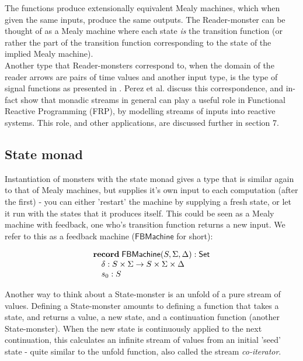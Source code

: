 \documentclass{article}
\begin{document}
The functions produce extensionally equivalent Mealy machines, which when given the same inputs, produce the same outputs. The Reader-monster can be thought of as a Mealy machine where each state \emph{is} the transition function (or rather the part of the transition function corresponding to the state of the implied Mealy machine). \\

Another type that Reader-monsters correspond to, when the domain of the reader arrows are pairs of time values and another input type, is the type of signal functions as presented in \cite{frp_refactored}. Perez et al. discuss this correspondence, and in-fact show that monadic streams in general can play a useful role in Functional Reactive Programming (FRP), by modelling streams of inputs into reactive systems. This role, and other applications, are discussed further in section 7.
                             
\subsection{State monad}

Instantiation of monsters with the state monad gives a type that is similar again to that of Mealy machines, but supplies it's own input to each computation (after the first) - you can either 'restart' the machine by supplying a fresh state, or let it run with the states that it produces itself. This could be seen as a Mealy machine with feedback, one who's transition function returns a new input. We refer to this as a feedback machine ($\mathsf{FBMachine}$ for short):

$$
\begin{array}[t]{l}
\mathbf{record}\;
\mathsf{FBMachine}(S,\Sigma,\Delta):\mathsf{Set}\\
\quad \delta : S \times \Sigma \to S \times \Sigma \times \Delta \\
\quad s_0 : S
\end{array}
$$

Another way to think about a State-monster is an unfold of a pure stream of values. Defining a State-monster amounts to defining a function that takes a state, and returns a value, a new state, and a continuation function (another State-monster). When the new state is continuously applied to the next continuation, this calculates an infinite stream of values from an initial 'seed' state - quite similar to the unfold function, also called the stream \emph{co-iterator}.
\end{document}
